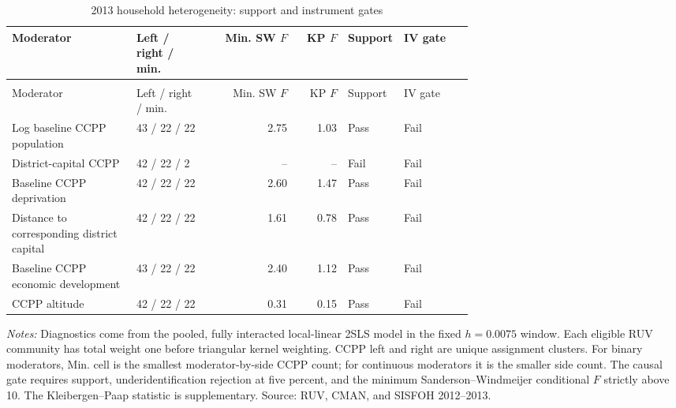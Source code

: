 \begingroup\fontsize{9.25}{11.4}\selectfont
\setlength{\tabcolsep}{3pt}\renewcommand{\arraystretch}{1.18}
\begin{longtable}{@{}>{\raggedright\arraybackslash}p{0.27\linewidth}p{0.16\linewidth}rrp{0.10\linewidth}p{0.15\linewidth}@{}}
\caption{2013 household heterogeneity: support and instrument gates}\label{tab:pub_A05} \\
\toprule Moderator & Left / right / min. & Min. SW \(F\) & KP \(F\) & Support & IV gate \\ \midrule\endfirsthead
\multicolumn{6}{c}{\tablename\ \thetable{} -- continued} \\
\toprule Moderator & Left / right / min. & Min. SW \(F\) & KP \(F\) & Support & IV gate \\ \midrule\endhead
Log baseline CCPP population & 43 / 22 / 22 & 2.75 & 1.03 & Pass & Fail \\
District-capital CCPP & 42 / 22 / 2 & -- & -- & Fail & Fail \\
Baseline CCPP deprivation & 42 / 22 / 22 & 2.60 & 1.47 & Pass & Fail \\
Distance to corresponding district capital & 42 / 22 / 22 & 1.61 & 0.78 & Pass & Fail \\
Baseline CCPP economic development & 43 / 22 / 22 & 2.40 & 1.12 & Pass & Fail \\
CCPP altitude & 42 / 22 / 22 & 0.31 & 0.15 & Pass & Fail \\
\bottomrule\end{longtable}
\parbox{0.97\linewidth}{\footnotesize \textit{Notes:} Diagnostics come from the pooled, fully interacted local-linear 2SLS model in the fixed \(h=0.0075\) window. Each eligible RUV community has total weight one before triangular kernel weighting. CCPP left and right are unique assignment clusters. For binary moderators, Min. cell is the smallest moderator-by-side CCPP count; for continuous moderators it is the smaller side count. The causal gate requires support, underidentification rejection at five percent, and the minimum Sanderson--Windmeijer conditional \(F\) strictly above 10. The Kleibergen--Paap statistic is supplementary. Source: RUV, CMAN, and SISFOH 2012--2013.}
\par{}\par\endgroup
